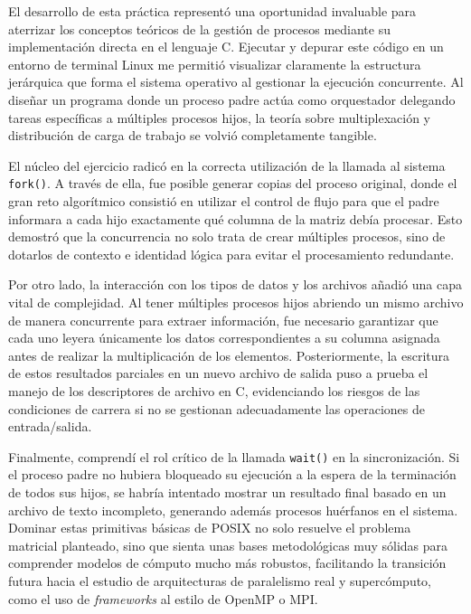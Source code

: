 El desarrollo de esta práctica representó una oportunidad invaluable para aterrizar los conceptos teóricos de la gestión de procesos mediante su implementación directa en el lenguaje C. Ejecutar y depurar este código en un entorno de terminal Linux me permitió visualizar claramente la estructura jerárquica que forma el sistema operativo al gestionar la ejecución concurrente. Al diseñar un programa donde un proceso padre actúa como orquestador delegando tareas específicas a múltiples procesos hijos, la teoría sobre multiplexación y distribución de carga de trabajo se volvió completamente tangible.

El núcleo del ejercicio radicó en la correcta utilización de la llamada al sistema \texttt{fork()}. A través de ella, fue posible generar copias del proceso original, donde el gran reto algorítmico consistió en utilizar el control de flujo para que el padre informara a cada hijo exactamente qué columna de la matriz debía procesar. Esto demostró que la concurrencia no solo trata de crear múltiples procesos, sino de dotarlos de contexto e identidad lógica para evitar el procesamiento redundante.

Por otro lado, la interacción con los tipos de datos y los archivos añadió una capa vital de complejidad. Al tener múltiples procesos hijos abriendo un mismo archivo de manera concurrente para extraer información, fue necesario garantizar que cada uno leyera únicamente los datos correspondientes a su columna asignada antes de realizar la multiplicación de los elementos. Posteriormente, la escritura de estos resultados parciales en un nuevo archivo de salida puso a prueba el manejo de los descriptores de archivo en C, evidenciando los riesgos de las condiciones de carrera si no se gestionan adecuadamente las operaciones de entrada/salida.

Finalmente, comprendí el rol crítico de la llamada \texttt{wait()} en la sincronización. Si el proceso padre no hubiera bloqueado su ejecución a la espera de la terminación de todos sus hijos, se habría intentado mostrar un resultado final basado en un archivo de texto incompleto, generando además procesos huérfanos en el sistema. Dominar estas primitivas básicas de POSIX no solo resuelve el problema matricial planteado, sino que sienta unas bases metodológicas muy sólidas para comprender modelos de cómputo mucho más robustos, facilitando la transición futura hacia el estudio de arquitecturas de paralelismo real y supercómputo, como el uso de \textit{frameworks} al estilo de OpenMP o MPI.

